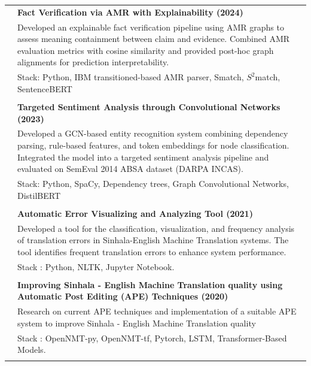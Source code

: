 \begin{supertabular}{r|p{17.5cm}}
\emph{} & \normalsize \bf Fact Verification via AMR with Explainability (2024) \textsc{}  \\\textsc{}&\small{Developed an explainable fact verification pipeline using AMR graphs to assess meaning containment between claim and evidence. Combined AMR evaluation metrics with cosine similarity and provided post-hoc graph alignments for prediction interpretability.}\\&\footnotesize{Stack: Python, IBM transitioned-based AMR parser, Smatch, \(S^2\)match, SentenceBERT}\\ \vspace{-0.08in}\\

\emph{} & \normalsize \bf Targeted Sentiment Analysis through Convolutional Networks (2023) \textsc{}  \\\textsc{}&\small{Developed a GCN-based entity recognition system combining dependency parsing, rule-based features, and token embeddings for node classification. Integrated the model into a targeted sentiment analysis pipeline and evaluated on SemEval 2014 ABSA dataset (DARPA INCAS).}\\&\footnotesize{Stack: Python, SpaCy,  Dependency trees, Graph Convolutional Networks, DistilBERT}\\ \vspace{-0.08in}\\

 \emph{} & \normalsize \bf Automatic Error Visualizing and Analyzing Tool (2021) \textsc{}  \\\textsc{}&\small{Developed a tool for the classification, visualization, and frequency analysis of translation errors in Sinhala-English Machine Translation systems. The tool identifies frequent translation errors to enhance system performance.}\\&\footnotesize{Stack : Python, NLTK, Jupyter Notebook.}\\ \vspace{-0.08in}\\
 
 \emph{} & \normalsize \bf Improving Sinhala - English Machine Translation quality using Automatic Post Editing (APE) Techniques (2020)\textsc{}  \\\textsc{}&\small{Research  on current APE techniques and implementation of a suitable APE system to improve Sinhala - English Machine Translation quality}\\&\footnotesize{Stack : OpenNMT-py, OpenNMT-tf, Pytorch, LSTM, Transformer-Based Models.}\\ \vspace{-0.08in}\\
 

\end{supertabular}
